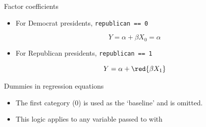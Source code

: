 \documentclass[t]{beamer}
\begin{document}

	\begin{frame}[c]{Factor coefficients}
	
		\begin{block}{}
			
			\begin{itemize}
				\item For Democrat presidents, \texttt{republican == 0}
				
				$$Y = \alpha + \beta X_0 = \alpha$$
				
				\item For Republican presidents, \texttt{republican == 1}
				
				$$Y = \alpha + \red{\beta X_1}$$
				
			\end{itemize}
						
		\end{block}
		
		\begin{block}{Dummies in regression equations}
			
			\begin{itemize}
			
				\item The first category (0) is used as the `baseline' and is omitted.
				\item This logic applies to any variable passed to  with 

			\end{itemize}
			
		\end{block}
	
	\end{frame}
	
\end{document}
